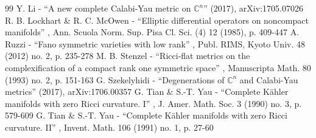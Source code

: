 \begin{thebibliography}{99}
 Y. Li - “A new complete Calabi-Yau metric on $\mathbb{C}^n$” (2017), arXiv:1705.07026
 R. B. Lockhart \& R. C. McOwen - “Elliptic differential operators on noncompact manifolds” , Ann. Scuola Norm. Sup. Pisa Cl. Sci. (4) 12 (1985), p. 409-447
 A. Ruzzi - “Fano symmetric varieties with low rank” , Publ. RIMS, Kyoto Univ. 48 (2012) no. 2, p. 235-278
 M. B. Stenzel - “Ricci-flat metrics on the complexification of a compact rank one symmetric space” , Manuscripta Math. 80 (1993) no. 2, p. 151-163
 G. Szekelyhidi - “Degenerations of $\mathbb{C}^n$ and Calabi-Yau metrics” (2017), arXiv:1706.00357
 G. Tian \& S.-T. Yau - “Complete Kähler manifolds with zero Ricci curvature. I” , J. Amer. Math. Soc. 3 (1990) no. 3, p. 579-609
 G. Tian \& S.-T. Yau - “Complete Kähler manifolds with zero Ricci curvature. II” , Invent. Math. 106 (1991) no. 1, p. 27-60
\end{thebibliography}
